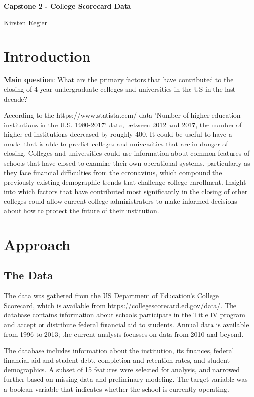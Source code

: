 \documentclass[11pt, letterpaper]{article}
\begin{document}
\begin{center}
\Large{\textbf{Capstone 2 - College Scorecard Data}}

\large{Kirsten Regier}
\end{center}

\section{Introduction}

\textbf{Main question}: What are the primary factors that have contributed to the closing of 4-year undergraduate colleges and universities in the US in the last decade?

According to the https://www.statista.com/ data 'Number of higher education institutions in the U.S. 1980-2017' data, between 2012 and 2017, the number of higher ed institutions decreased by roughly 400.  It could be useful to have a model that is able to predict colleges and universities that are in danger of closing. 
Colleges and universities could use information about common features of schools that have closed to examine their own operational systems, particularly as they face financial difficulties from the coronavirus, which compound the previously existing demographic trends that challenge college enrollment. Insight into which factors that have contributed most significantly in the closing of other colleges could allow current college administrators to make informed decisions about how to protect the future of their institution.

\section{Approach}
\subsection{The Data}
The data was gathered from the US Department of Education's College Scorecard, which is available from https://collegescorecard.ed.gov/data/. The database contains information about schools participate in the Title IV program and accept or distribute federal financial aid to students. Annual data is available from 1996 to 2013; the current analysis focusses on data from 2010 and beyond.

The database includes information about the institution, its finances, federal financial aid and student debt, completion and retention rates, and student demographics. A subset of 15 features were selected for analysis, and narrowed further based on missing data and preliminary modeling. The target variable was a boolean variable that indicates whether the school is currently operating.
\end{document}
